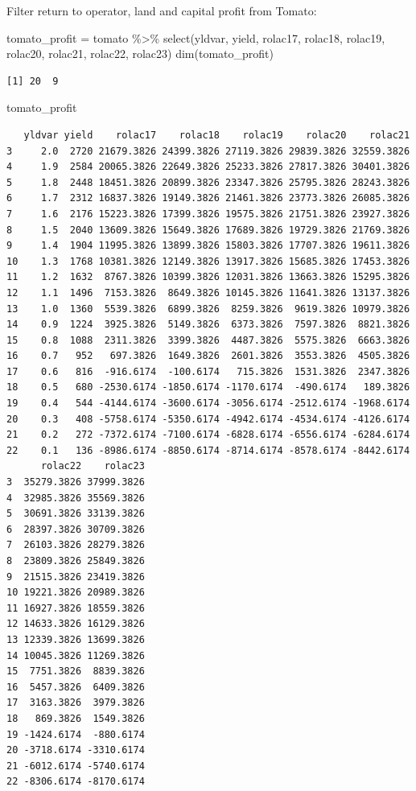 \documentclass[
  letterpaper,
  DIV=11,
  numbers=noendperiod]{scrartcl}
\newenvironment{Shaded}{\begin{snugshade}}{\end{snugshade}}
\newcommand{\FunctionTok}[1]{\textcolor[rgb]{0.28,0.35,0.67}{#1}}
\newcommand{\NormalTok}[1]{\textcolor[rgb]{0.00,0.23,0.31}{#1}}
\newcommand{\OtherTok}[1]{\textcolor[rgb]{0.00,0.23,0.31}{#1}}
\newcommand{\SpecialCharTok}[1]{\textcolor[rgb]{0.37,0.37,0.37}{#1}}
\begin{document}
Filter return to operator, land and capital profit from Tomato:

\begin{Shaded}
\begin{Highlighting}[]
\NormalTok{tomato\_profit }\OtherTok{=}\NormalTok{ tomato }\SpecialCharTok{\%\textgreater{}\%} 
  \FunctionTok{select}\NormalTok{(yldvar, yield, }
\NormalTok{         rolac17, rolac18, rolac19, rolac20, }
\NormalTok{         rolac21, rolac22, rolac23)}
\FunctionTok{dim}\NormalTok{(tomato\_profit)}
\end{Highlighting}
\end{Shaded}

\begin{verbatim}
[1] 20  9
\end{verbatim}

\begin{Shaded}
\begin{Highlighting}[]
\NormalTok{tomato\_profit}
\end{Highlighting}
\end{Shaded}

\begin{verbatim}
   yldvar yield    rolac17    rolac18    rolac19    rolac20    rolac21
3     2.0  2720 21679.3826 24399.3826 27119.3826 29839.3826 32559.3826
4     1.9  2584 20065.3826 22649.3826 25233.3826 27817.3826 30401.3826
5     1.8  2448 18451.3826 20899.3826 23347.3826 25795.3826 28243.3826
6     1.7  2312 16837.3826 19149.3826 21461.3826 23773.3826 26085.3826
7     1.6  2176 15223.3826 17399.3826 19575.3826 21751.3826 23927.3826
8     1.5  2040 13609.3826 15649.3826 17689.3826 19729.3826 21769.3826
9     1.4  1904 11995.3826 13899.3826 15803.3826 17707.3826 19611.3826
10    1.3  1768 10381.3826 12149.3826 13917.3826 15685.3826 17453.3826
11    1.2  1632  8767.3826 10399.3826 12031.3826 13663.3826 15295.3826
12    1.1  1496  7153.3826  8649.3826 10145.3826 11641.3826 13137.3826
13    1.0  1360  5539.3826  6899.3826  8259.3826  9619.3826 10979.3826
14    0.9  1224  3925.3826  5149.3826  6373.3826  7597.3826  8821.3826
15    0.8  1088  2311.3826  3399.3826  4487.3826  5575.3826  6663.3826
16    0.7   952   697.3826  1649.3826  2601.3826  3553.3826  4505.3826
17    0.6   816  -916.6174  -100.6174   715.3826  1531.3826  2347.3826
18    0.5   680 -2530.6174 -1850.6174 -1170.6174  -490.6174   189.3826
19    0.4   544 -4144.6174 -3600.6174 -3056.6174 -2512.6174 -1968.6174
20    0.3   408 -5758.6174 -5350.6174 -4942.6174 -4534.6174 -4126.6174
21    0.2   272 -7372.6174 -7100.6174 -6828.6174 -6556.6174 -6284.6174
22    0.1   136 -8986.6174 -8850.6174 -8714.6174 -8578.6174 -8442.6174
      rolac22    rolac23
3  35279.3826 37999.3826
4  32985.3826 35569.3826
5  30691.3826 33139.3826
6  28397.3826 30709.3826
7  26103.3826 28279.3826
8  23809.3826 25849.3826
9  21515.3826 23419.3826
10 19221.3826 20989.3826
11 16927.3826 18559.3826
12 14633.3826 16129.3826
13 12339.3826 13699.3826
14 10045.3826 11269.3826
15  7751.3826  8839.3826
16  5457.3826  6409.3826
17  3163.3826  3979.3826
18   869.3826  1549.3826
19 -1424.6174  -880.6174
20 -3718.6174 -3310.6174
21 -6012.6174 -5740.6174
22 -8306.6174 -8170.6174
\end{verbatim}
\end{document}

